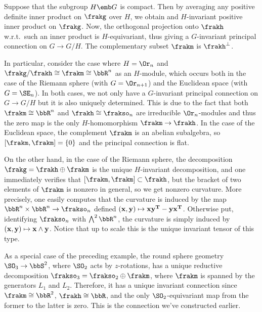 \begin{example}\label{ex 1.4.6 Cap}
    Suppose that the subgroup $H\emb G$ is compact. Then by averaging any positive definite inner product on $\frakg$ over $H$, we obtain and $H$-invariant positive inner product on $\frakg$. Now, the orthogonal projection onto $\frakh$ w.r.t.\ such an inner product is $H$-equivariant, thus giving a $G$-invariant principal connection on $G\to G\slash H$. The complementary subset $\frakm$ is $\frakh^\perp$.

    In particular, consider the case where $H=\Or_n$ and $\frakg\slash\frakh\cong \frakm\cong \bbR^n$ as an $H$-module, which occurs both in the case of the Riemann sphere (with $G=\Or_{n+1}$) and the Euclidean space (with $G=\SE_n$). In both cases, we not only have a $G$-invariant principal connection on $G\to G\slash H$ but it is also uniquely determined. This is due to the fact that both $\frakm\cong\bbR^n$ and $\frakh\cong \frakso_n$ are irreducible $\Or_n$-modules and thus the zero map is the only $H$-homomorphism $\frakm\to \frakh$. In the case of the Euclidean space, the complement $\frakm$ is an abelian subalgebra, so $[\frakm,\frakm]=\{0\}$ and the principal connection is flat.

    On the other hand, in the case of the Riemann sphere, the decomposition $\frakg=\frakh\oplus\frakm$ is the unique $H$-invariant decomposition, and one immediately verifies that $[\frakm,\frakm]\subset\frakh$, but the bracket of two elements of $\frakm$ is nonzero in general, so we get nonzero curvature. More precisely, one easily computes that the curvature is induced by the map $\bbR^n\times\bbR^n\to \frakso_n$ defined $(\bf{x},\bf{y})\mapsto \bf{x}\bf{y}^T-\bf{y}\bf{x}^T$. Otherwise put, identifying $\frakso_n$ with $\bigwedge^2\bbR^n$, the curvature is simply induced by $(\bf{x},\bf{y})\mapsto \bf{x}\wedge \bf{y}$. Notice that up to scale this is the unique invariant tensor of this type.
 \end{example}

 \begin{example}\label{ex round sphere 5}
    As a special case of the preceding example, the round sphere geometry $\SO_3\to \bbS^2$, where $\SO_2$ acts by $z$-rotations, has a unique reductive decomposition $\frakso_3=\frakso_2\oplus\frakm$, where $\frakm$ is spanned by the generators $L_1$ and $L_2$. Therefore, it has a unique invariant connection since $\frakm\cong \bbR^2$, $\frakh\cong \bbR$, and the only $\SO_2$-equivariant map from the former to the latter is zero. This is the connection we've constructed earlier.
\end{example}


